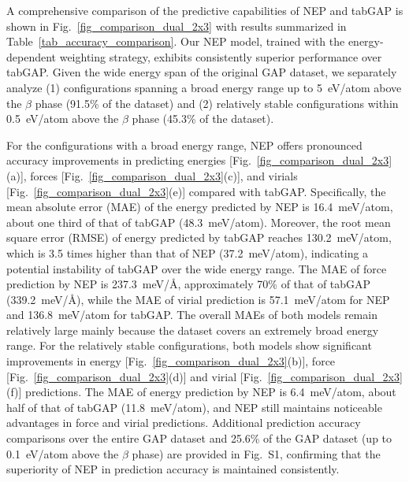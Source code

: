 \documentclass[aip,graphicx,amsmath,amssymb]{revtex4-1}
\newcommand{\meVA}{meV/$\text{\AA}$}
\begin{document}
A comprehensive comparison of the predictive capabilities of NEP and tabGAP is
shown in Fig.~\ref{fig_comparison_dual_2x3} with results summarized in Table~\ref{tab_accuracy_comparison}. 
Our NEP model, trained with the
energy-dependent weighting strategy, exhibits consistently superior performance
over tabGAP.
Given the wide energy span of the original GAP dataset, we separately analyze
(1) configurations spanning a broad energy range up to 5~eV/atom above the $\beta$ phase 
(91.5\% of the dataset) and (2) relatively stable configurations within 
0.5~eV/atom above the $\beta$ phase (45.3\% of the dataset).

For the configurations with a broad energy range, NEP offers pronounced accuracy
improvements in predicting energies
[Fig.~\ref{fig_comparison_dual_2x3}(a)],
forces
[Fig.~\ref{fig_comparison_dual_2x3}(c)],
and virials
[Fig.~\ref{fig_comparison_dual_2x3}(e)]
compared with tabGAP.
Specifically, the mean absolute error (MAE) of the energy predicted by NEP is
16.4~meV/atom, about one third of that of tabGAP (48.3~meV/atom).
Moreover, the root mean square error (RMSE) of energy predicted by tabGAP
reaches 130.2~meV/atom, which is 3.5 times higher than that of NEP
(37.2~meV/atom), indicating a potential instability of tabGAP over the wide
energy range.
The MAE of force prediction by NEP is 237.3~\meVA, approximately 70\% 
of that of tabGAP (339.2~\meVA), while the MAE of virial prediction is
57.1~meV/atom for NEP and 136.8~meV/atom for tabGAP.
The overall MAEs of both models remain relatively large mainly because the dataset
covers an extremely broad energy range.
For the relatively stable configurations, both models show significant improvements in
energy 
[Fig.~\ref{fig_comparison_dual_2x3}(b)],
force
[Fig.~\ref{fig_comparison_dual_2x3}(d)]
and virial
[Fig.~\ref{fig_comparison_dual_2x3}(f)]
predictions.
The MAE of energy prediction by NEP is 6.4~meV/atom, about half of that of
tabGAP (11.8~meV/atom), and NEP still maintains noticeable advantages in force
and virial predictions.
Additional prediction accuracy comparisons over the entire GAP dataset and 
25.6\% of the GAP dataset (up to 0.1~eV/atom above the $\beta$ phase) are provided in Fig.~S1, 
confirming that the superiority of NEP in prediction accuracy is maintained consistently.
\end{document}
